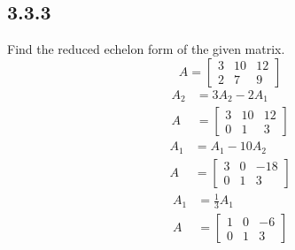 \documentclass{article}
\begin{document}
\subsection{3.3.3}
Find the reduced echelon form of the given matrix.
\begin{equation*}
	A = \begin{bmatrix}
		3 & 10 & 12 \\
		2 & 7 & 9
	\end{bmatrix}
\end{equation*}
\begin{align*}
	A_2 & = 3A_2 - 2A_1 \\
	A & = \begin{bmatrix}
		3 & 10 & 12 \\
		0 & 1 & 3
	\end{bmatrix}
\end{align*}
\begin{align*}
	A_1 & = A_1 - 10A_2 \\
	A & = \begin{bmatrix}
		3 & 0 & -18 \\
		0 & 1 & 3
	\end{bmatrix}
\end{align*}
\begin{align*}
	A_1 & = \frac{1}{3}A_1 \\
	A & = \begin{bmatrix}
		1 & 0 & -6 \\
		0 & 1 & 3
	\end{bmatrix}
\end{align*}
\end{document}
